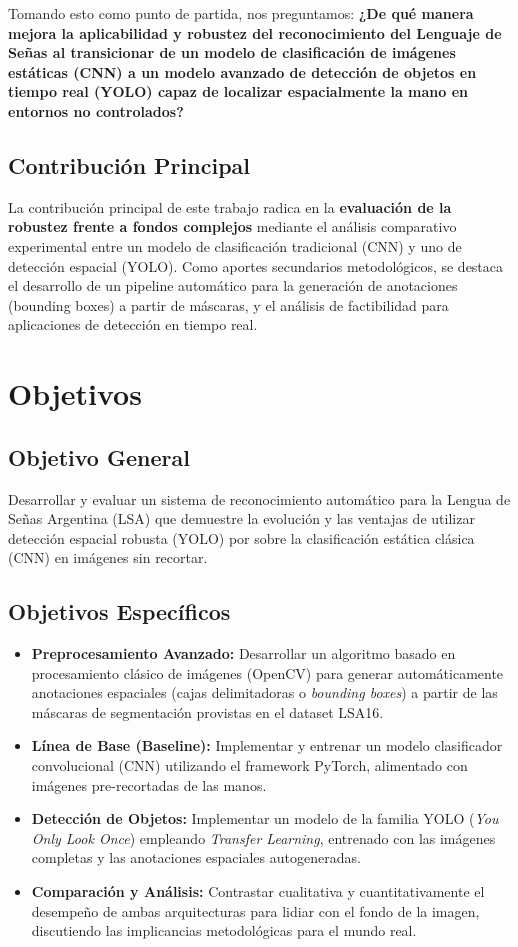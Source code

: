 \documentclass[a4paper,12pt]{article}
\begin{document}
Tomando esto como punto de partida, nos preguntamos: \textbf{¿De qué manera mejora la aplicabilidad y robustez del reconocimiento del Lenguaje de Señas al transicionar de un modelo de clasificación de imágenes estáticas (CNN) a un modelo avanzado de detección de objetos en tiempo real (YOLO) capaz de localizar espacialmente la mano en entornos no controlados?}

\subsection{Contribución Principal}
La contribución principal de este trabajo radica en la \textbf{evaluación de la robustez frente a fondos complejos} mediante el análisis comparativo experimental entre un modelo de clasificación tradicional (CNN) y uno de detección espacial (YOLO). Como aportes secundarios metodológicos, se destaca el desarrollo de un pipeline automático para la generación de anotaciones (bounding boxes) a partir de máscaras, y el análisis de factibilidad para aplicaciones de detección en tiempo real.

\section{Objetivos}

\subsection{Objetivo General}
Desarrollar y evaluar un sistema de reconocimiento automático para la Lengua de Señas Argentina (LSA) que demuestre la evolución y las ventajas de utilizar detección espacial robusta (YOLO) por sobre la clasificación estática clásica (CNN) en imágenes sin recortar.

\subsection{Objetivos Específicos}
\begin{itemize}
    \item \textbf{Preprocesamiento Avanzado:} Desarrollar un algoritmo basado en procesamiento clásico de imágenes (OpenCV) para generar automáticamente anotaciones espaciales (cajas delimitadoras o \textit{bounding boxes}) a partir de las máscaras de segmentación provistas en el dataset LSA16.
    \item \textbf{Línea de Base (Baseline):} Implementar y entrenar un modelo clasificador convolucional (CNN) utilizando el framework PyTorch, alimentado con imágenes pre-recortadas de las manos.
    \item \textbf{Detección de Objetos:} Implementar un modelo de la familia YOLO (\textit{You Only Look Once}) empleando \textit{Transfer Learning}, entrenado con las imágenes completas y las anotaciones espaciales autogeneradas.
    \item \textbf{Comparación y Análisis:} Contrastar cualitativa y cuantitativamente el desempeño de ambas arquitecturas para lidiar con el fondo de la imagen, discutiendo las implicancias metodológicas para el mundo real.
\end{itemize}
\end{document}
